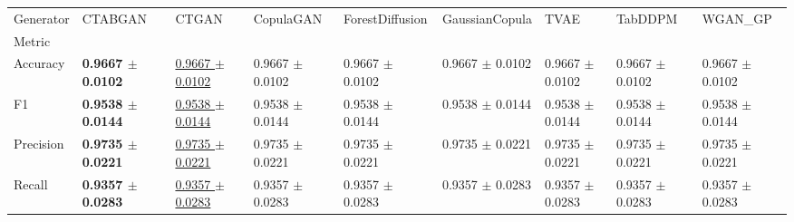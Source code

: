 \begin{tabular}{lllllllll}
\toprule
Generator & CTABGAN & CTGAN & CopulaGAN & ForestDiffusion & GaussianCopula & TVAE & TabDDPM & WGAN_GP \\
Metric &  &  &  &  &  &  &  &  \\
\midrule
Accuracy & \textbf{0.9667 $\pm$ 0.0102} & \underline{0.9667 $\pm$ 0.0102} & 0.9667 $\pm$ 0.0102 & 0.9667 $\pm$ 0.0102 & 0.9667 $\pm$ 0.0102 & 0.9667 $\pm$ 0.0102 & 0.9667 $\pm$ 0.0102 & 0.9667 $\pm$ 0.0102 \\
F1 & \textbf{0.9538 $\pm$ 0.0144} & \underline{0.9538 $\pm$ 0.0144} & 0.9538 $\pm$ 0.0144 & 0.9538 $\pm$ 0.0144 & 0.9538 $\pm$ 0.0144 & 0.9538 $\pm$ 0.0144 & 0.9538 $\pm$ 0.0144 & 0.9538 $\pm$ 0.0144 \\
Precision & \textbf{0.9735 $\pm$ 0.0221} & \underline{0.9735 $\pm$ 0.0221} & 0.9735 $\pm$ 0.0221 & 0.9735 $\pm$ 0.0221 & 0.9735 $\pm$ 0.0221 & 0.9735 $\pm$ 0.0221 & 0.9735 $\pm$ 0.0221 & 0.9735 $\pm$ 0.0221 \\
Recall & \textbf{0.9357 $\pm$ 0.0283} & \underline{0.9357 $\pm$ 0.0283} & 0.9357 $\pm$ 0.0283 & 0.9357 $\pm$ 0.0283 & 0.9357 $\pm$ 0.0283 & 0.9357 $\pm$ 0.0283 & 0.9357 $\pm$ 0.0283 & 0.9357 $\pm$ 0.0283 \\
\bottomrule
\end{tabular}
